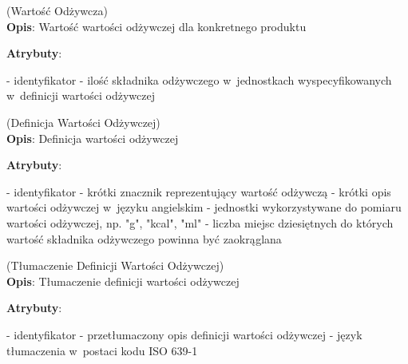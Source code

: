 \begin{enumerate}[label={\textbf{KAT/1/\protect\twodigits{\theenumi}}}, wide, labelwidth=!, labelindent=0pt, labelsep=0pt, series=reqs]
    \label{kat:NutritionData} (Wartość Odżywcza)\\
    \indent\textbf{Opis}: Wartość wartości odżywczej dla konkretnego produktu
    \par
    \textbf{Atrybuty}:
    \begin{itemize}[series=atr, wide, align=left, leftmargin=190pt]
        \label{kat:NutritionData:id}- identyfikator
        \label{kat:NutritionData:nutritionValue}- ilość składnika odżywczego w~jednostkach wyspecyfikowanych w~definicji wartości odżywczej
    \end{itemize}

    \label{kat:NutritionDefinition} (Definicja Wartości Odżywczej)\\
    \indent\textbf{Opis}: Definicja wartości odżywczej
    \par
    \textbf{Atrybuty}:
    \begin{itemize}[series=atr, wide, align=left, leftmargin=190pt]
        \label{kat:NutritionDefinition:id}- identyfikator
        \label{kat:NutritionDefinition:tag}- krótki znacznik reprezentujący wartość odżywczą
        \label{kat:NutritionDefinition:description}- krótki opis wartości odżywczej w~języku angielskim
        \label{kat:NutritionDefinition:units}- jednostki wykorzystywane do pomiaru wartości odżywczej, np. "g", "kcal", "ml"
        \label{kat:NutritionDefinition:decimalPlaces}- liczba miejsc dziesiętnych do których wartość składnika odżywczego powinna być zaokrąglana
    \end{itemize}

    \label{kat:NutritionDefinitionTranslation} (Tłumaczenie Definicji Wartości Odżywczej)\\
    \indent\textbf{Opis}: Tłumaczenie definicji wartości odżywczej
    \par
    \textbf{Atrybuty}:
    \begin{itemize}[series=atr, wide, align=left, leftmargin=190pt]
        \label{kat:NutritionDefinitionTranslation:id}- identyfikator
        \label{kat:NutritionDefinitionTranslation:translation}- przetłumaczony opis definicji wartości odżywczej
        \label{kat:NutritionDefinitionTranslation:language}- język tłumaczenia w~postaci kodu ISO 639-1
    \end{itemize}


\end{enumerate}
